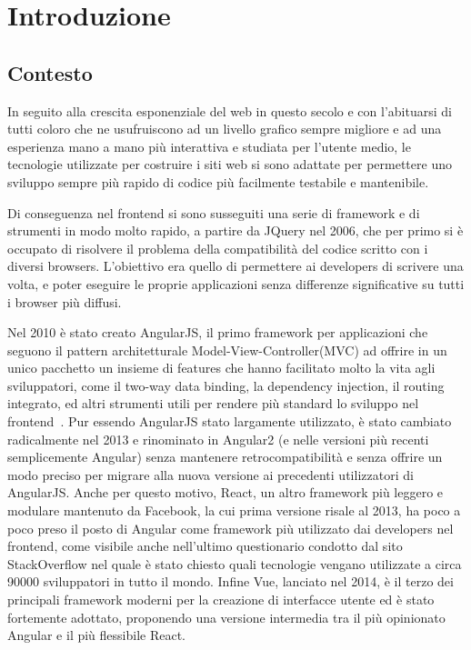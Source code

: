 \chapter{Introduzione}\label{cap:introduzione}

\section{Contesto}\label{sez:contesto}

In seguito alla crescita esponenziale del web in questo secolo e con l'abituarsi di tutti coloro che ne usufruiscono ad un livello grafico sempre migliore e ad una esperienza mano a mano pi\`u interattiva e studiata per l'utente medio, le tecnologie utilizzate per costruire i siti web si sono adattate per permettere uno sviluppo sempre pi\`u rapido di codice pi\`u facilmente testabile e mantenibile.

Di conseguenza nel frontend si sono susseguiti una serie di framework e di strumenti in modo molto rapido, a partire da JQuery\cite{jquery} nel 2006, che per primo si \`e occupato di risolvere il problema della compatibilit\`a del codice scritto con i diversi browsers.
L'obiettivo era quello di permettere ai developers di scrivere una volta, e poter eseguire le proprie applicazioni senza differenze significative su tutti i browser pi\`u diffusi.

Nel 2010 \`e stato creato AngularJS, il primo framework per applicazioni che seguono il pattern architetturale Model-View-Controller(MVC) ad offrire in un unico pacchetto un insieme di features che hanno facilitato molto la vita agli sviluppatori, come il two-way data binding, la dependency injection, il routing integrato, ed altri strumenti utili per rendere pi\`u standard lo sviluppo nel frontend~\cite{Hoff}.
Pur essendo AngularJS stato largamente utilizzato, \`e stato cambiato radicalmente nel 2013 e rinominato in Angular2 (e nelle versioni pi\`u recenti semplicemente Angular) senza mantenere retrocompatibilit\`a e senza offrire un modo preciso per migrare alla nuova versione ai precedenti utilizzatori di AngularJS.
Anche per questo motivo, React, un altro framework pi\`u leggero e modulare mantenuto da Facebook, la cui prima versione risale al 2013, ha poco a poco preso il posto di Angular come framework pi\`u utilizzato dai developers nel frontend, come visibile anche nell'ultimo questionario condotto dal sito StackOverflow nel quale \`e stato chiesto quali tecnologie vengano utilizzate a circa 90000 sviluppatori in tutto il mondo\cite{stackOverflow2019}.
Infine Vue, lanciato nel 2014, \`e il terzo dei principali framework moderni per la creazione di interfacce utente ed \`e stato fortemente adottato, proponendo una versione intermedia tra il pi\`u opinionato Angular e il pi\`u flessibile React\cite{vueJs}.

